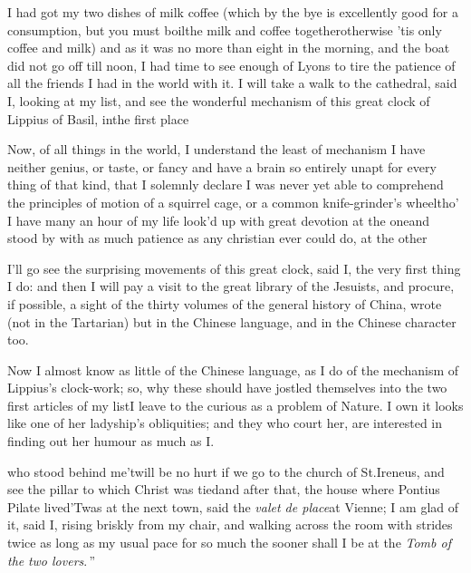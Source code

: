 \documentclass{article}
\begin{document}
I had got my two dishes of milk coffee (which by the bye is
excellently good for a consumption, but you must boil\break the milk
and coffee together\tsk otherwise ’tis only coffee and milk)\tsk
and as it was no more than eight in the morning, and the boat
did not go off till noon,\break
I had time to see enough of Lyons to
tire the patience of all the friends I had in the world with it.
I will take a walk to the cathedral, said I, looking at my list,
and see the wonderful mechanism of this great clock of Lippius
of Basil, in\break the first place\tsh

Now, of all things in the world, I
understand the least of mechanism\tsh\break
I have neither genius, or taste, or fancy\break
\tsk and have a brain so entirely unapt for
every
thing of that kind, that I solemnly declare I was never yet able to comprehend the
principles of motion of a squirrel cage, or a common knife-grinder’s wheel\tsk tho’ I
have many an hour of my life look’d up with great devotion at the one\tsk and stood by
with as much patience as any christian ever could do, at the other\tsh

I’ll go see the surprising movements of this great clock, said I, the very first
thing I do: and then I will pay a visit to the great library of the Jesuists\sic, and
procure, if possible, a sight of the thirty volumes of the general history of China,
wrote (not in the Tartarian) but in the Chinese language, and in the Chinese
character too.

Now I almost know as little of the\break
Chinese language, as I do of the mechanism of
Lippius’s clock-work; so,\break
why these should have jostled themselves into the two
first articles of my list\tsh I leave to the curious as a pro\-blem of Nature.  I own
it looks like one of her ladyship’s obliquities; and they who court her, are
interested in finding out her humour as much as I.

\noindent
{}\break
{}
who stood behind me\tsh ’twill be no hurt if we go to the church of
St.\@ Ire\-neus, and see the pillar to which Christ was tied\tsh and after that, the
house where Pontius Pilate lived\tsh ’Twas at
the next town, said the \textit{valet de place}\tsk at Vienne; I
am glad of it, said I, rising briskly from my chair, and walking
across the room with strides twice as long as my usual pace\tsh
\lqq for so much\break
\lqq the sooner shall I be at the \textit{Tomb of the}\break
\lqq \textit{two lovers}.\,”
\end{document}

